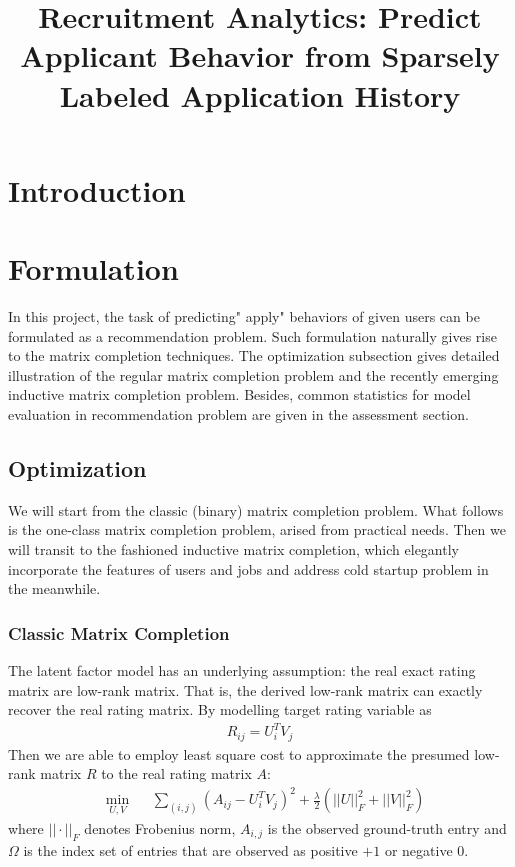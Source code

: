 \documentclass{article} %
\title{Recruitment Analytics: Predict Applicant Behavior from Sparsely Labeled Application History}
\author{
}
\begin{document}
\maketitle

\section{Introduction}

\section{Formulation}
In this project, the task of predicting" apply" behaviors of given users can
be formulated as a recommendation problem. Such formulation naturally
gives rise to the matrix completion techniques. The optimization subsection
gives detailed illustration of the regular matrix completion problem and the
recently emerging inductive matrix completion problem. Besides, common
statistics for model evaluation in recommendation problem are given in the
assessment section. 

\subsection{Optimization}
We will start from the classic (binary) matrix completion problem. What
follows is the one-class matrix completion problem, arised from practical
needs. Then we will transit to the fashioned inductive matrix completion,
which elegantly incorporate the features of users and jobs and address cold
startup problem in the meanwhile. 

\subsubsection{Classic Matrix Completion}
The latent factor model has an underlying assumption: the real exact rating matrix are
low-rank matrix. That is, the derived low-rank matrix can exactly recover the
real rating matrix. By modelling target rating variable as 
\begin{align}
    R_{ij} = U_i^T V_j 
\end{align}
Then we are able to employ least square cost to approximate the presumed low-rank
matrix $R$ to the real rating matrix $A$: 
\begin{equation}
    \begin{aligned}
        &\min_{U,V} 
        && \sum_{(i,j)} (A_{ij} - U_i^T V_j)^2
        + \frac{\lambda}{2}(||U||_F^2 + ||V||_F^2)
    \end{aligned}
\end{equation}
where $|| \cdot ||_F$ denotes Frobenius norm, $A_{i,j}$ is the observed
ground-truth entry and $\Omega$ is the index set of entries that are observed
as positive $+1$ or negative $0$. 
\end{document}
